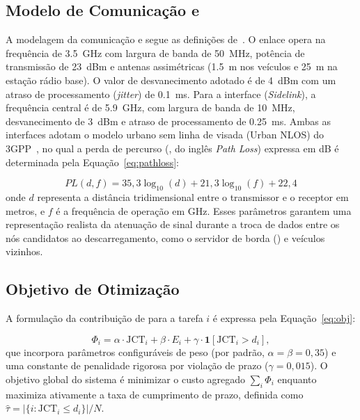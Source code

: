 \subsection{Modelo de Comunicação  e }

A modelagem da comunicação  e  segue as definições de~\cite{3gpp38901, yan2024towards}. O enlace  opera na frequência de \SI{3.5}{\giga\hertz} com largura de banda de \SI{50}{\mega\hertz}, potência de transmissão de \SI{23}{dBm} e antenas assimétricas (\SI{1,5}{\meter} nos veículos e \SI{25}{\meter} na estação rádio base). O valor de desvanecimento adotado é de \SI{4}{dBm} com um atraso de processamento (\textit{jitter}) de \SI{0,1}{\milli\second}. Para a interface  (\textit{Sidelink}), a frequência central é de \SI{5.9}{\giga\hertz}, com largura de banda de \SI{10}{\mega\hertz}, desvanecimento de \SI{3}{dBm} e atraso de processamento de \SI{0,25}{\milli\second}. Ambas as interfaces adotam o modelo urbano sem linha de visada (Urban NLOS) do 3GPP~\cite{3gpp38901}, no qual a perda de percurso (, do inglês \textit{Path Loss}) expressa em dB é determinada pela Equação~\ref{eq:pathloss}:

\begin{equation}
\label{eq:pathloss}
PL(d, f) = 35{,}3 \log_{10}(d) + 21{,}3 \log_{10}(f) + 22{,}4
\end{equation}
onde $d$ representa a distância tridimensional entre o transmissor e o receptor em metros, e $f$ é a frequência de operação em \unit{\giga\hertz}. Esses parâmetros garantem uma representação realista da atenuação de sinal durante a troca de dados entre os nós candidatos ao descarregamento, como o servidor de borda () e veículos vizinhos.

\subsection{Objetivo de Otimização}

A formulação da contribuição de  para a tarefa $i$ é expressa pela Equação~\ref{eq:obj}:

\begin{equation}
\label{eq:obj}
\Phi_i = \alpha \cdot \mathrm{JCT}_i + \beta \cdot E_i + \gamma \cdot \mathbf{1}[\mathrm{JCT}_i > d_i],
\end{equation}
que incorpora parâmetros configuráveis de peso (por padrão, $\alpha = \beta = 0{,}35$) e uma constante de penalidade rigorosa por violação de prazo ($\gamma = 0{,}015$). O objetivo global do sistema é minimizar o custo agregado $\sum_i \Phi_i$ enquanto maximiza ativamente a taxa de cumprimento de prazo, definida como $\hat{\tau} = |\{i : \mathrm{JCT}_i \le d_i\}| / N$.
